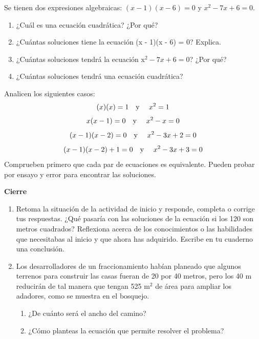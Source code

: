 \documentclass[11pt]{book}
\begin{document}
Se tienen dos expresiones algebraicas: $(x - 1)(x - 6) = 0$ y $x^2 - 7x + 6 = 0$.

\begin{enumerate}
  \item ¿Cuál es una ecuación cuadrática? ¿Por qué?
  \item ¿Cuántas soluciones tiene la ecuación (x - 1)(x - 6) = 0? Explica.
  \item ¿Cuántas soluciones tendrá la ecuación x$^2 - 7x + 6 = 0$? ¿Por qué?
  \item ¿Cuántas soluciones tendrá una ecuación cuadrática?
\end{enumerate}

Analicen los siguientes casos:
\[(x)(x) = 1 \text{\quad y \quad} x^2 = 1\]
\[x(x - 1) = 0 \text{\quad y \quad}x^2 - x = 0\]
\[(x - 1)(x - 2) = 0 \text{\quad y \quad} x^2 - 3x + 2 = 0\]
\[(x - 1)(x - 2) + 1 = 0 \text{\quad y \quad} x^2 - 3x + 3 = 0\]
Comprueben primero que
cada par de ecuaciones es equivalente. Pueden probar por ensayo y error para
encontrar las soluciones.\\

\begin{boxK}
  \begin{center}\textbf{Cierre}\end{center}
  \begin{enumerate}
    \item Retoma la situación de la actividad de inicio y responde, completa o corrige
          tus respuestas. ¿Qué pasaría con las soluciones de la ecuación si los 120 son
          metros cuadrados?
          Reflexiona acerca de los conocimientos o las habilidades que necesitabas al
          inicio y que ahora has adquirido. Escribe en tu cuaderno una conclusión.
    \item Los desarrolladores de un fraccionamiento habían planeado que algunos
          terrenos para construir las casas fueran de 20 por 40 metros, pero los
          40 m
          reducirán de tal manera que tengan 525 m$^2$ de área para ampliar los adadores, como se muestra en el bosquejo.
          \begin{enumerate}
            \item ¿De cuánto será el ancho del camino?
            \item ¿Cómo planteas la ecuación que permite resolver el problema?
          \end{enumerate}
  \end{enumerate}
\end{boxK}
\end{document}
